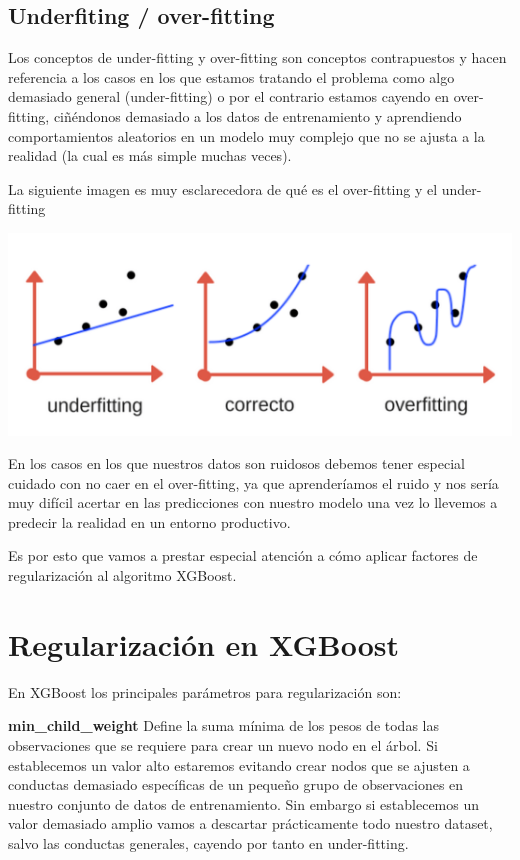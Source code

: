 \subsection*{Underfiting / over-fitting}

Los conceptos de under-fitting y over-fitting son conceptos contrapuestos y hacen referencia a los casos en los que estamos tratando el problema como algo demasiado general (under-fitting) o por el contrario estamos cayendo en over-fitting, ciñéndonos demasiado a los datos de entrenamiento y aprendiendo comportamientos aleatorios en un modelo muy complejo que no se ajusta a la realidad (la cual es más simple muchas veces).  

La siguiente imagen es muy esclarecedora de qué es el over-fitting y el under-fitting

\begin{center}
\includegraphics[scale=0.7]{./img/generalizacion-machine-learning.png}
\end{center}

En los casos en los que nuestros datos son ruidosos debemos tener especial cuidado con no caer en el over-fitting, ya que aprenderíamos el ruido y nos sería muy difícil acertar en las predicciones con nuestro modelo una vez lo llevemos a predecir la realidad en un entorno productivo.

Es por esto que vamos a prestar especial atención a cómo aplicar factores de regularización al algoritmo XGBoost.

\section{Regularización en XGBoost}

En XGBoost los principales parámetros para regularización son:

\textbf{min\_child\_weight}
Define la suma mínima de los pesos de todas las observaciones que se requiere para crear un nuevo nodo en el árbol.
Si establecemos un valor alto estaremos evitando crear nodos que se ajusten a conductas demasiado específicas de un pequeño grupo de observaciones en nuestro conjunto de datos de entrenamiento.
Sin embargo si establecemos un valor demasiado amplio vamos a descartar prácticamente todo nuestro dataset, salvo las conductas generales, cayendo por tanto en under-fitting.


